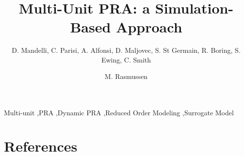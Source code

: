 \documentclass{elsarticle}
\begin{document}
\begin{frontmatter}

\title{Multi-Unit PRA: a Simulation-Based Approach}

\author{D. Mandelli, C. Parisi, A. Alfonsi, D. Maljovec, S. St Germain, R. Boring, S. Ewing, C. Smith}
\address{Idaho National Laboratory (INL), 2525 Fremont Ave, 83402 Idaho Falls (ID), USA}

\author{M. Rasmussen}
\address{Norwegian University of Science and Technology (NTNU)}

\begin{abstract}

\end{abstract}

\begin{keyword}
Multi-unit \sep PRA \sep Dynamic PRA \sep Reduced Order Modeling \sep Surrogate Model
\end{keyword}

\end{frontmatter}

\linenumbers

\printnomenclature[1in]














\section*{References}


\end{document}
